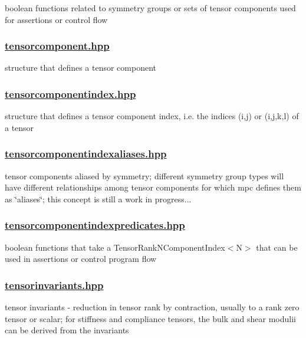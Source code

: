 boolean functions related to symmetry groups or sets of tensor components used for assertions or control flow

\subsubsection*{\mbox{\hyperlink{tensorcomponent_8hpp}{tensorcomponent.\+hpp}}}

structure that defines a tensor component

\subsubsection*{\mbox{\hyperlink{tensorcomponentindex_8hpp}{tensorcomponentindex.\+hpp}}}

structure that defines a tensor component index, i.\+e. the indices (i,j) or (i,j,k,l) of a tensor

\subsubsection*{\mbox{\hyperlink{tensorcomponentindexaliases_8hpp}{tensorcomponentindexaliases.\+hpp}}}

tensor components aliased by symmetry; different symmetry group types will have different relationships among tensor components for which mpc defines them as \char`\"{}aliases\char`\"{}; this concept is still a work in progress...

\subsubsection*{\mbox{\hyperlink{tensorcomponentindexpredicates_8hpp}{tensorcomponentindexpredicates.\+hpp}}}

boolean functions that take a Tensor\+Rank\+N\+Component\+Index$<$\+N$>$ that can be used in assertions or control program flow

\subsubsection*{\mbox{\hyperlink{tensorinvariants_8hpp}{tensorinvariants.\+hpp}}}

tensor invariants -\/ reduction in tensor rank by contraction, usually to a rank zero tensor or scalar; for stiffness and compliance tensors, the bulk and shear modulii can be derived from the invariants 